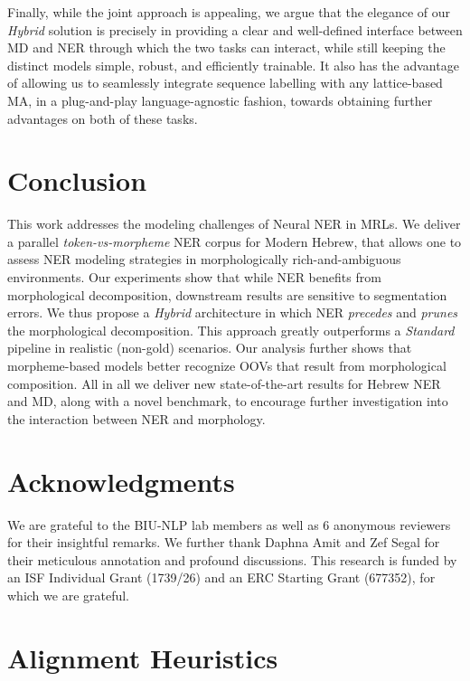 \documentclass[11pt,a4paper]{article}
\newcommand{\FLIPMACRO}{{\em Hybrid}\xspace}
\newcommand{\YAPMACRO}{{\em Standard}\xspace}
\begin{document}
Finally, while the joint approach is appealing, we argue that the elegance of our  {\em Hybrid} solution is precisely in providing a clear and well-defined interface between MD and NER through which the two tasks can interact, while still keeping the distinct models simple, robust, and efficiently trainable. It also has the advantage of allowing us to seamlessly integrate sequence labelling with any  lattice-based MA,
in a plug-and-play language-agnostic  fashion, towards obtaining further advantages on both of these tasks.



\section{Conclusion}
\label{sec:conclusions}
This work addresses the modeling challenges of Neural NER in MRLs. 
We deliver a  parallel {\em token-vs-morpheme} NER corpus for Modern Hebrew, that allows one to assess   NER modeling strategies in morphologically rich-and-ambiguous environments. Our experiments show that while 
NER   benefits from morphological decomposition,
 downstream results are  sensitive to segmentation errors.
We thus  propose a   \FLIPMACRO architecture in which NER {\em precedes} and  {\em prunes} the morphological decomposition. This approach greatly outperforms a \YAPMACRO~ {pipeline} in realistic (non-gold)  scenarios.
Our analysis further shows  that morpheme-based models better recognize OOVs that result from morphological composition. 
All in all we deliver new state-of-the-art results for  Hebrew NER and MD,  along with a novel benchmark, to encourage further investigation  into the interaction between  NER and morphology.

\section*{Acknowledgments}
We are grateful to the BIU-NLP lab members as well as 6 anonymous reviewers for their insightful remarks. We further thank Daphna Amit and Zef Segal for their meticulous annotation and profound discussions. This research is funded by an ISF Individual Grant (1739/26) and an ERC Starting Grant (677352), for which we are grateful.


 




\appendix


\section{Alignment Heuristics}
\label{sec:appendix-extending-morph}
\end{document}
